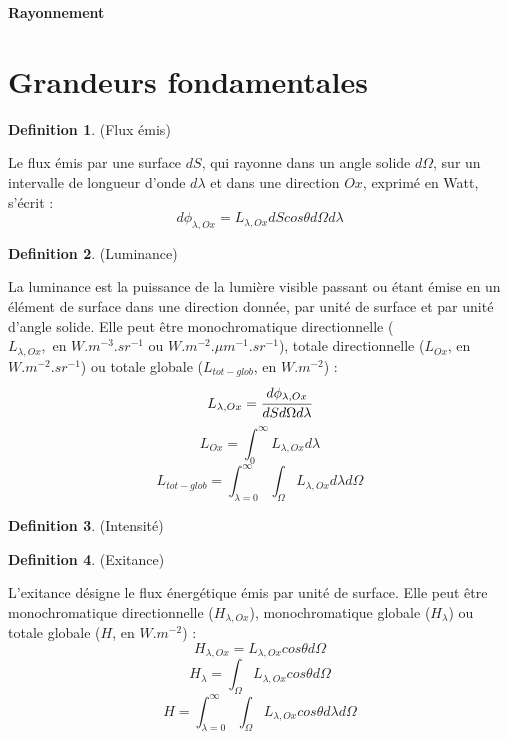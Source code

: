 \documentclass[french]{article}
\theoremstyle{definition}
\newtheorem{definition}{Definition}[section]
\begin{document}
\begin{center}
     \textbf{\Huge{Rayonnement}}
\end{center}

\section{Grandeurs fondamentales}

\begin{definition}(Flux émis)\par
    Le flux émis par une surface $dS$, qui rayonne dans un angle solide $d\Omega$, sur un intervalle de longueur d'onde $d\lambda$ et dans une direction $Ox$, exprimé en Watt, s'écrit :
    $$d\phi_{\lambda,Ox} = L_{\lambda,Ox}dScos\theta d\Omega d\lambda$$
\end{definition}

\begin{definition}(Luminance)\par
    La luminance est la puissance de la lumière visible passant ou étant émise en un élément de surface dans une direction donnée, par unité de surface et par unité d'angle solide. Elle peut être monochromatique directionnelle ($L_{\lambda,Ox},\text{ en } W.m^{-3}.sr^{-1}$ ou $W.m^{-2}.\mu m^{-1}.sr^{-1}$), totale directionnelle ($L_{Ox}$, en $W.m^{-2}.sr^{-1}$) ou totale globale ($L_{tot-glob}$, en $W.m^{-2}$) :
        $$L_{\lambda,Ox} = \cfrac{d\phi_{\lambda,Ox}}{dSd\Omega d\lambda}$$
        $$L_{Ox} = \int_0^{\infty}L_{\lambda,Ox}d\lambda$$
        $$L_{tot-glob} = \int_{\lambda=0}^{\infty}\int_{\Omega}L_{\lambda,Ox}d\lambda d\Omega$$
\end{definition}

\begin{definition}(Intensité)\par
    
    
\end{definition}

\begin{definition}(Exitance)\par
    L'exitance désigne le flux énergétique émis par unité de surface. Elle peut être monochromatique directionnelle ($H_{\lambda,Ox}$), monochromatique globale ($H_{\lambda}$) ou totale globale ($H$, en $W.m^{-2}$) :
        $$H_{\lambda,Ox} = L_{\lambda,Ox}cos\theta d\Omega$$
        $$H_{\lambda} = \int_{\Omega}L_{\lambda,Ox}cos\theta d\Omega$$
        $$H = \int_{\lambda=0}^{\infty}\int_{\Omega}L_{\lambda,Ox}cos\theta d\lambda d\Omega$$
\end{definition}
\end{document}
